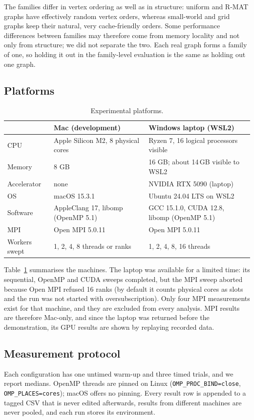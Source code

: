 \documentclass[conference]{IEEEtran}
\begin{document}
The families differ in vertex ordering as well as in structure: uniform and R-MAT graphs have effectively random vertex orders, whereas small-world and grid graphs keep their natural, very cache-friendly orders. Some performance differences between families may therefore come from memory locality and not only from structure; we did not separate the two. Each real graph forms a family of one, so holding it out in the family-level evaluation is the same as holding out one graph.

\subsection{Platforms}
\begin{table}[!tb]
\caption{Experimental platforms.}
\label{tab:platforms}
\centering\footnotesize\setlength{\tabcolsep}{3pt}
\begin{tabular}{@{}p{}p{}p{}@{}}
\toprule
 & Mac (development) & Windows laptop (WSL2) \\
\midrule
CPU & Apple Silicon M2, 8 physical cores & Ryzen 7, 16 logical processors visible \\
Memory & 8 GB & 16 GB; about 14\,GB visible to WSL2 \\
Accelerator & none & NVIDIA RTX 5090 (laptop) \\
OS & macOS 15.3.1 & Ubuntu 24.04 LTS on WSL2 \\
Software & AppleClang 17, libomp (OpenMP 5.1) & GCC 15.1.0, CUDA 12.8, libomp (OpenMP 5.1) \\
MPI & Open MPI 5.0.11 & Open MPI 5.0.11 \\
Workers swept & 1, 2, 4, 8 threads or ranks & 1, 2, 4, 8, 16 threads \\
\bottomrule
\end{tabular}
\end{table}
Table~\ref{tab:platforms} summarises the machines. The laptop was available for a limited time: its sequential, OpenMP and CUDA sweeps completed, but the MPI sweep aborted because Open MPI refused 16 ranks (by default it counts physical cores as slots and the run was not started with oversubscription). Only four MPI measurements exist for that machine, and they are excluded from every analysis. MPI results are therefore Mac-only, and since the laptop was returned before the demonstration, its GPU results are shown by replaying recorded data.

\subsection{Measurement protocol}
Each configuration has one untimed warm-up and three timed trials, and we report medians. OpenMP threads are pinned on Linux (\texttt{OMP\_PROC\_BIND=close}, \texttt{OMP\_PLACES=cores}); macOS offers no pinning. Every result row is appended to a tagged CSV that is never edited afterwards, results from different machines are never pooled, and each run stores its environment.
\end{document}
